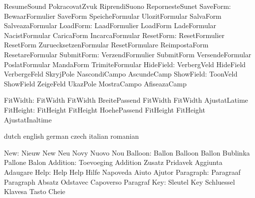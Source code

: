                            ResumeSound               PokracovatZvuk
                           RiprendiSuono             RepornesteSunet %
                 SaveForm: BewaarFormulier           SaveForm
                           SpeicheFormular           UlozitFormular
                           SalvaForm                 SalveazaFormular
                 LoadForm: LaadFormulier             LoadForm
                           LadeFormular              NacistFormular
                           CaricaForm                IncarcaFormular
                ResetForm: ResetFormulier            ResetForm
                           ZuruecksetzenFormular     ResetFormulare
                           ReimpostaForm             ResetareFormular
               SubmitForm: VerzendFormulier          SubmitForm
                           VersendeFormular          PoslatFormular
                           MandaForm                 TrimiteFormular
                HideField: VerbergVeld               HideField
                           VerbergeFeld              SkryjPole
                           NascondiCampo             AscundeCamp
                ShowField: ToonVeld                  ShowField
                           ZeigeFeld                 UkazPole
                           MostraCampo               AfiseazaCamp

                 FitWidth: FitWidth                  FitWidth
                           BreitePassend             FitWidth
                           FitWidth                  AjustatLatime
                FitHeight: FitHeight                 FitHeight
                           HoehePassend              FitHeight
                           FitHeight                 AjustatInaltime

\stopvariables


\startvariables            dutch                     english
                           german                    czech
                           italian                   romanian

                      New: Nieuw                     New
                           Neu                       Novy
                           Nuovo                     Nou
                  Balloon: Ballon                    Balloon
                           Ballon                    Bublinka
                           Pallone                   Balon
                 Addition: Toevoeging                Addition
                           Zusatz                    Pridavek
                           Aggiunta                  Adaugare
                     Help: Help                      Help
                           Hilfe                     Napoveda
                           Aiuto                     Ajutor
                Paragraph: Paragraaf                 Paragraph
                           Absatz                    Odstavec
                           Capoverso                 Paragraf
                      Key: Sleutel                   Key
                           Schluessel                Klavesa
                           Tasto                     Cheie
\stopvariables

